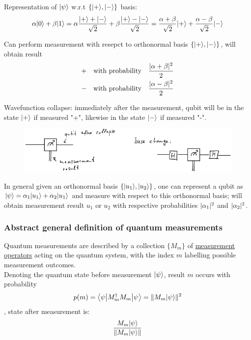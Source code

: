 Representation of $\lvert\psi\rangle$ w.r.t $\{\lvert+\rangle, \lvert-\rangle\}$ basis:
\begin{equation*}
    \alpha \lvert0\rangle + \beta \lvert1\rangle 
        = \alpha \frac{\lvert+\rangle + \lvert-\rangle}{\sqrt{2}} + \beta \frac{\lvert+\rangle - \lvert-\rangle}{\sqrt{2}}
        = \frac{\alpha + \beta}{\sqrt{2}} \lvert+\rangle + \frac{\alpha - \beta}{\sqrt{2}} \lvert-\rangle
\end{equation*}

Can perform measurement with resepct to orthonormal basis $\{\lvert+\rangle, \lvert-\rangle\}$, will obtain result
\begin{align*}
    + \quad &\text{with probability} \quad \frac{\lvert\alpha + \beta\rvert^2}{2} \\
    - \quad &\text{with probability} \quad \frac{\lvert\alpha - \beta\rvert^2}{2}
\end{align*}

Wavefunction collapse: immediately after the measurement, qubit will be in the state $\lvert+\rangle$ if 
measured "+", likewise in the state $\lvert-\rangle$ if measured "-".

\begin{figure}[H]
    \centering
    \includegraphics[scale=0.5]{chapters/res/measurement-collapse-basis.png}
\end{figure}

In general given an orthonormal basis $\{\lvert u_1\rangle, \lvert u_2\rangle\}$,
one can represent a qubit as $\lvert\psi\rangle = \alpha_1 \lvert u_1\rangle + \alpha_2 \lvert u_1\rangle$
and measure with respect to this orthonormal basis;
will obtain measurement result $u_1$ or $u_2$ with respective probabilities $\lvert\alpha_1\rvert^2$
and $\lvert\alpha_2\rvert^2$.

\subsubsection{Abstract general definition of quantum measurements}
Quantum measurements are described by a collection $\{M_m\}$ of 
\underline{measurement} \underline{operators} acting on the quantum system, with the index $m$ labelling possible 
measurement outcomes. \\
Denoting the quantum state before measurement $\lvert\psi\rangle$, result $m$ occurs with probability
\begin{equation}
    p(m) = \left \langle \psi \middle| M_m^\dag M_m \middle| \psi \right \rangle = \lVert M_m \lvert\psi\rangle\rVert^2
\end{equation}
, state after measurement is:
\begin{equation}
    \frac{M_m \lvert\psi\rangle}{\lVert M_m \lvert\psi\rangle\rVert}
\end{equation}

